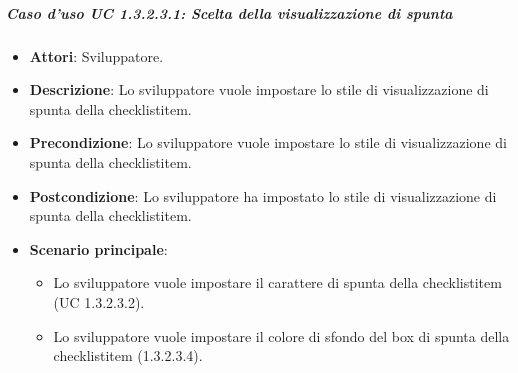 \subparagraph{Caso d'uso UC 1.3.2.3.1: Scelta della visualizzazione di spunta}

\FloatBarrier
\begin{itemize}
\item\textbf{Attori}: Sviluppatore.
\item\textbf{Descrizione}: Lo sviluppatore vuole impostare lo stile di visualizzazione di spunta della checklistitem.
\item\textbf{Precondizione}: Lo sviluppatore vuole impostare lo stile di visualizzazione di spunta della checklistitem.
\item\textbf{Postcondizione}: Lo sviluppatore ha impostato lo stile di visualizzazione di spunta della checklistitem.
\item\textbf{Scenario principale}: 
\begin{itemize}
	\item Lo sviluppatore vuole impostare il carattere di spunta della checklistitem (UC 1.3.2.3.2).
	\item Lo sviluppatore vuole impostare il colore di sfondo del box di spunta della checklistitem (1.3.2.3.4).
\end{itemize}
\end{itemize}